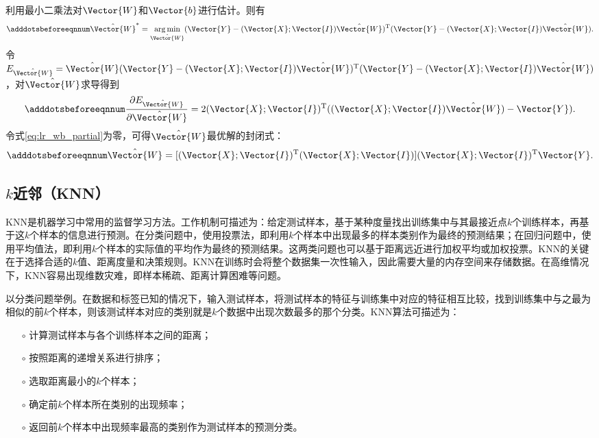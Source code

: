 利用最小二乘法对$\Vector{W}$和$\Vector{b}$进行估计。则有
\begin{equation}\adddotsbeforeeqnnum
  \label{eq:lr_wb}
  \hat{\Vector{W}}^*=\mathop{\arg\min}\limits_{\hat{\Vector{W}}}(\Vector{Y}-(\Vector{X};\Vector{I})\hat{\Vector{W}})^{\text{T}}(\Vector{Y}-(\Vector{X};\Vector{I})\hat{\Vector{W}}).
\end{equation}
令$E_{\hat{\Vector{W}}}={\hat{\Vector{W}}}(\Vector{Y}-(\Vector{X};\Vector{I})\hat{\Vector{W}})^{\text{T}}(\Vector{Y}-(\Vector{X};\Vector{I})\hat{\Vector{W}})$，对$\hat{\Vector{W}}$求导得到
\begin{equation}\adddotsbeforeeqnnum
  \label{eq:lr_wb_partial}
  \frac{\partial{E_{\hat{\Vector{W}}}}}{\partial{\hat{\Vector{W}}}}=2(\Vector{X};\Vector{I})^{\text{T}}((\Vector{X};\Vector{I})\hat{\Vector{W}})-\Vector{Y}).
\end{equation}
令式\ref{eq:lr_wb_partial}为零，可得$\hat{\Vector{W}}$最优解的封闭式：
\begin{equation}\adddotsbeforeeqnnum
  \label{eq:lr_wb_feng}
  \hat{\Vector{W}}=[(\Vector{X};\Vector{I})^{\text{T}}(\Vector{X};\Vector{I})](\Vector{X};\Vector{I})^{\text{T}}\Vector{Y}.
\end{equation}

\subsection{$k$近邻（KNN）}\label{sec:ml_knn}

KNN是机器学习中常用的监督学习方法。工作机制可描述为：给定测试样本，基于某种度量找出训练集中与其最接近点$k$个训练样本，再基于这$k$个样本的信息进行预测。在分类问题中，使用投票法，即利用$k$个样本中出现最多的样本类别作为最终的预测结果；在回归问题中，使用平均值法，即利用$k$个样本的实际值的平均作为最终的预测结果。这两类问题也可以基于距离远近进行加权平均或加权投票。KNN的关键在于选择合适的$k$值、距离度量和决策规则。KNN在训练时会将整个数据集一次性输入，因此需要大量的内存空间来存储数据。在高维情况下，KNN容易出现维数灾难，即样本稀疏、距离计算困难等问题。

以分类问题举例。在数据和标签已知的情况下，输入测试样本，将测试样本的特征与训练集中对应的特征相互比较，找到训练集中与之最为相似的前$k$个样本，则该测试样本对应的类别就是$k$个数据中出现次数最多的那个分类。KNN算法可描述为：
\begin{enumerate}
  \item[$\circ$] 计算测试样本与各个训练样本之间的距离；
  \item[$\circ$] 按照距离的递增关系进行排序；
  \item[$\circ$] 选取距离最小的$k$个样本；
  \item[$\circ$] 确定前$k$个样本所在类别的出现频率；
  \item[$\circ$] 返回前$k$个样本中出现频率最高的类别作为测试样本的预测分类。
\end{enumerate}

